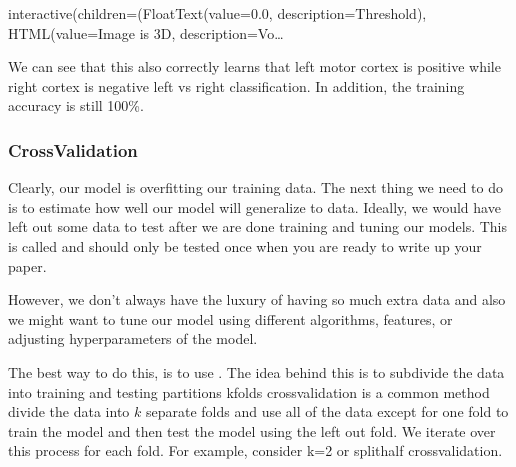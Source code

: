 \documentclass[letterpaper,10pt,english]{sphinxmanual}
\begin{document}
\noindent{}

\begin{sphinxVerbatim}[commandchars=\\\{\}]
\PYG{p}{[}\PYG{p}{]}
\end{sphinxVerbatim}

\begin{sphinxVerbatim}[commandchars=\\\{\}]
interactive(children=(FloatText(value=0.0, description=\PYGZsq{}Threshold\PYGZsq{}), HTML(value=\PYGZsq{}Image is 3D\PYGZsq{}, description=\PYGZsq{}Vo…
\end{sphinxVerbatim}

We can see that this also correctly learns that left motor cortex is positive while right cortex is negative \sphinxhyphen{} left vs right classification.  In addition, the training accuracy is still 100\%.


\subsubsection{Cross\sphinxhyphen{}Validation}
\label{\detokenize{content/Multivariate_Prediction:cross-validation}}
Clearly, our model is overfitting our training data. The next thing we need to do is to estimate how well our model will generalize to  data.  Ideally, we would have left out some data to test after we are done training and tuning our models.  This is called  and should only be tested once when you are ready to write up your paper.

However, we don’t always have the luxury of having so much extra data and also we might want to tune our model using different algorithms, features, or adjusting hyperparameters of the model.

The best way to do this, is to use . The idea behind this is to subdivide the data into training and testing partitions \sphinxhyphen{} k\sphinxhyphen{}folds cross\sphinxhyphen{}validation is a common method \sphinxhyphen{} divide the data into \(k\) separate folds and use all of the data except for one fold to train the model and then test the model using the left out fold. We iterate over this process for each fold. For example, consider k=2 or split\sphinxhyphen{}half cross\sphinxhyphen{}validation.
\end{document}
